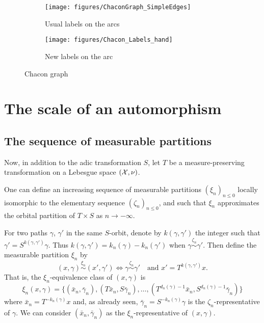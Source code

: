 \documentclass[12pt,a4paper]{article}
\begin{document}
\begin{figure}[!h]
   \centering
   \begin{subfigure}[t]{0.47\textwidth}
   \centering
   	\texttt{[image: figures/ChaconGraph\_SimpleEdges]}
 		\caption{\footnotesize Usual labels on the arcs}\label{fig:ChaconGraph_simpleedges}
    \end{subfigure}              
   \quad
    \begin{subfigure}[t]{0.47\textwidth}
    \centering
   	\texttt{[image: figures/Chacon\_Labels\_hand]}
 		\caption{\footnotesize New labels on the arc}\label{fig:ChaconGraph_newlabs}
 	\end{subfigure}      

   \caption{Chacon graph}
   \label{fig:ChaconGraph}
 \end{figure}



\section{The scale of an automorphism}

\subsection{The sequence of measurable partitions}

Now, in addition to the adic transformation $S$, let $T$ be a measure-preserving transformation on a Lebesgue space $(\mathcal{X}, \nu)$. 

One can define an increasing sequence of measurable partitions ${(\xi_n)}_{n \leq 0}$ 
locally isomorphic to the elementary sequence ${(\zeta_n)}_{n \leq 0}$,  
and such that $\xi_n$ approximates the orbital partition of $T \times S$ as 
$n \to -\infty$.

For two paths $\gamma$, $\gamma'$ in the same $S$-orbit, denote by $k(\gamma,\gamma')$ 
the integer such that $\gamma'=S^{k(\gamma,\gamma')}\gamma$. 
Thus $k(\gamma,\gamma') = k_n(\gamma)-k_n(\gamma')$ when $\gamma \overset{\zeta_n}{\sim} \gamma'$. 
Then define the measurable partition $\xi_n$ by 
$$
\boxed{(x, \gamma) \overset{\xi_n}{\sim} (x', \gamma') \iff 
\gamma \overset{\zeta_n}{\sim} \gamma' \quad 
\text{and $x'=T^{k(\gamma,\gamma')}x$}}. 
$$
That is, the $\xi_n$-equivalence class of $(x,\gamma)$ is 
$$
\boxed{\xi_n(x,\gamma) = \bigl\{(\bar x_n, \bar\gamma_n), (T\bar x_n, S\bar\gamma_n), 
\ldots, (T^{d_n(\gamma)-1}\bar x_n, S^{d_n(\gamma)-1}\bar\gamma_n) \bigr\}}
$$
where $\bar x_n = T^{-k_n(\gamma)}x$ and, as already seen, 
$\bar\gamma_n = S^{-k_n(\gamma)}\gamma$ is the $\zeta_n$-representative of 
$\gamma$. 
We can consider $(\bar x_n, \bar\gamma_n)$ as the $\xi_n$-representative of
$(x,\gamma)$. 
\end{document}
